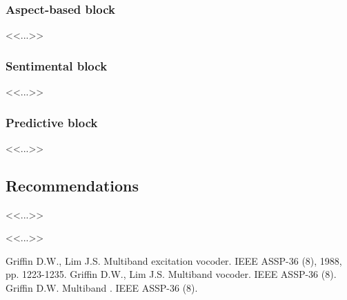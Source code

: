 \documentclass[a4paper,12pt]{extarticle}
\begin{document}
    \subsubsection{Aspect-based block}
    <<...>>

    \subsubsection{Sentimental block}
    <<...>>

    \subsubsection{Predictive block}
    <<...>>

    \subsection{Recommendations}
    <<...>>

    <<...>>

    \begin{thebibliography}{1}
         Griffin D.W., Lim J.S. \flqq Multiband excitation vocoder\frqq. IEEE ASSP-36 (8), 1988, pp. 1223-1235.
         Griffin D.W., Lim J.S. \flqq Multiband  vocoder\frqq. IEEE ASSP-36 (8).
         Griffin D.W. \flqq Multiband \frqq. IEEE ASSP-36 (8).
    \end{thebibliography}
\end{document}
